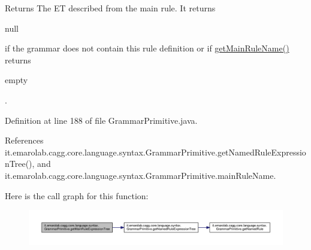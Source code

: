 \begin{DoxyReturn}{Returns}
The E\-T described from the main rule. It returns
\begin{DoxyCode}
null 
\end{DoxyCode}
 if the grammar does not contain this rule definition or if \hyperlink{classit_1_1emarolab_1_1cagg_1_1core_1_1language_1_1syntax_1_1GrammarPrimitive_a82656685c1fced207c2cb8a20bf977a7}{get\-Main\-Rule\-Name()} returns
\begin{DoxyCode}
empty 
\end{DoxyCode}
 . 
\end{DoxyReturn}


Definition at line 188 of file Grammar\-Primitive.\-java.



References it.\-emarolab.\-cagg.\-core.\-language.\-syntax.\-Grammar\-Primitive.\-get\-Named\-Rule\-Expression\-Tree(), and it.\-emarolab.\-cagg.\-core.\-language.\-syntax.\-Grammar\-Primitive.\-main\-Rule\-Name.



Here is the call graph for this function\-:\nopagebreak
\begin{figure}[H]
\begin{center}
\leavevmode
\includegraphics[width=350pt]{classit_1_1emarolab_1_1cagg_1_1core_1_1language_1_1syntax_1_1GrammarPrimitive_a3903903354a4f2a47cb102519e691a64_cgraph}
\end{center}
\end{figure}


